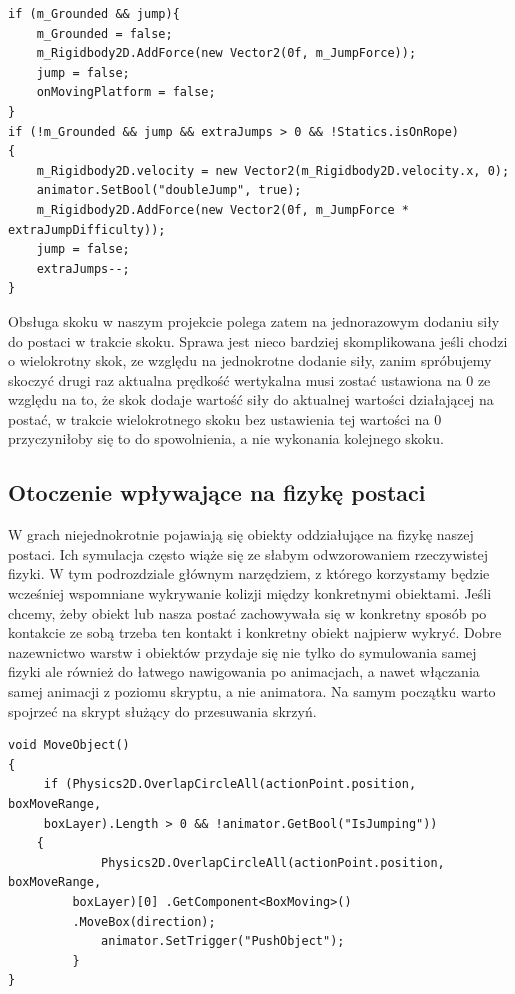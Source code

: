 \documentclass[oneside,polski,logo]{amuthesis}
\begin{document}
\begin{lstlisting}[breaklines=true,
language={[Sharp]C},
rulecolor=\color{blue!80!black},
caption={Fragment klasy \texttt{CharacterController.cs}}
]
if (m_Grounded && jump){
	m_Grounded = false;
	m_Rigidbody2D.AddForce(new Vector2(0f, m_JumpForce));
	jump = false;
	onMovingPlatform = false;
}
if (!m_Grounded && jump && extraJumps > 0 && !Statics.isOnRope)
{
	m_Rigidbody2D.velocity = new Vector2(m_Rigidbody2D.velocity.x, 0);
	animator.SetBool("doubleJump", true);
	m_Rigidbody2D.AddForce(new Vector2(0f, m_JumpForce * extraJumpDifficulty));
	jump = false;
	extraJumps--;
}
\end{lstlisting}
\newpage
Obsługa skoku w naszym projekcie polega zatem na jednorazowym dodaniu siły do postaci w trakcie skoku. Sprawa jest nieco bardziej skomplikowana jeśli chodzi o wielokrotny skok, ze względu na jednokrotne dodanie siły, zanim spróbujemy skoczyć drugi raz aktualna prędkość wertykalna musi zostać ustawiona na 0 ze względu na to, że skok dodaje wartość siły do aktualnej wartości działającej na postać, w trakcie wielokrotnego skoku bez ustawienia tej wartości na 0 przyczyniłoby się to do spowolnienia, a nie wykonania kolejnego skoku.
\subsection{Otoczenie wpływające na fizykę postaci}
W grach niejednokrotnie pojawiają się obiekty oddziałujące na fizykę naszej postaci. Ich symulacja często wiąże się ze słabym odwzorowaniem rzeczywistej fizyki. W tym podrozdziale głównym narzędziem, z którego korzystamy będzie wcześniej wspomniane wykrywanie kolizji między konkretnymi obiektami. Jeśli chcemy, żeby obiekt lub nasza postać zachowywała się w konkretny sposób po kontakcie ze sobą trzeba ten kontakt i konkretny obiekt najpierw wykryć. Dobre nazewnictwo warstw i obiektów przydaje się nie tylko do symulowania samej fizyki ale również do łatwego nawigowania po animacjach, a nawet włączania samej animacji z poziomu skryptu, a nie animatora. Na samym początku warto spojrzeć na skrypt służący do przesuwania skrzyń.

\begin{lstlisting}[breaklines=true,
language={[Sharp]C},
rulecolor=\color{blue!80!black},
caption={Fragment klasy \texttt{PlayerMovement.cs}}
]
void MoveObject()
{
	 if (Physics2D.OverlapCircleAll(actionPoint.position, boxMoveRange, 
	 boxLayer).Length > 0 && !animator.GetBool("IsJumping"))
	{
           	 Physics2D.OverlapCircleAll(actionPoint.position, boxMoveRange,
		 boxLayer)[0] .GetComponent<BoxMoving>()
		 .MoveBox(direction);
           	 animator.SetTrigger("PushObject");
      	 }
}
\end{lstlisting}
\end{document}
